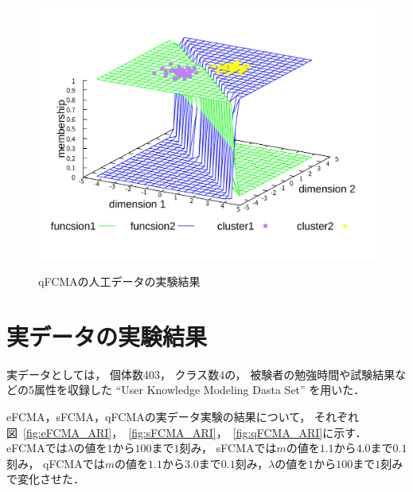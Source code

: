 \documentclass[twocolumn, a4paper]{icethesisabst}
\begin{document}
\begin{figure}[htbp]
\begin{minipage}{0.43\hsize}
  \includegraphics[width=\linewidth]{qFCMA-Em11-Lambda10000.pdf}
  \label{fig:qFCMA-Em11-Lambda10000}
 \end{minipage}
 \vspace*{0.5cm}
 \caption{qFCMAの人工データの実験結果}
\end{figure}


\section{実データの実験結果}
実データとしては，
個体数403，
クラス数4の，
被験者の勉強時間や試験結果などの5属性を収録した
``User Knowledge Modeling Dasta Set''
を用いた．

eFCMA，sFCMA，qFCMAの実データ実験の結果について，
それぞれ図~\ref{fig:eFCMA_ARI}，~\ref{fig:sFCMA_ARI}，~\ref{fig:qFCMA_ARI}に示す．
eFCMAでは$\lambda$の値を$1$から$100$まで$1$刻み，
sFCMAでは$m$の値を$1.1$から$4.0$まで$0.1$刻み，
qFCMAでは$m$の値を$1.1$から$3.0$まで$0.1$刻み，$\lambda$の値を$1$から$100$まで$1$刻みで変化させた．
\end{document}
